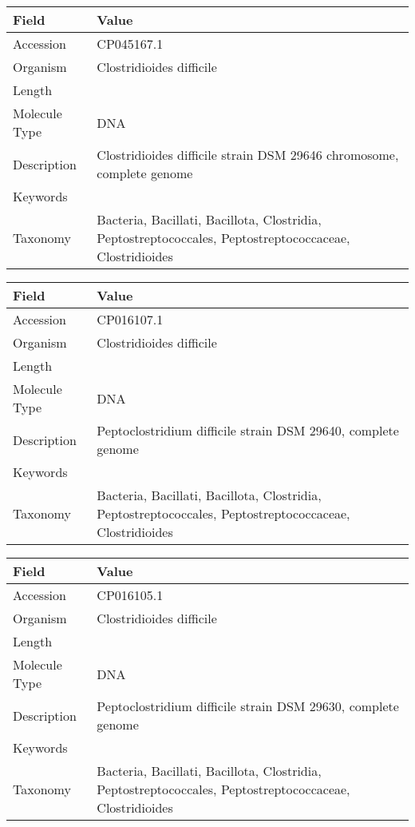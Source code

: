 \documentclass[10pt]{article}
\begin{document}
{\footnotesize
\begin{longtable}{>{\raggedright\arraybackslash}p{4.5cm} >{\raggedright\arraybackslash}p{11.5cm}}
\textbf{Field} & \textbf{Value} \\
\hline
Accession & CP045167.1 \\
Organism & Clostridioides difficile \\
Length & 4261912 \\
Molecule Type & DNA \\
Description & Clostridioides difficile strain DSM 29646 chromosome, complete genome \\
Keywords &  \\
Taxonomy & Bacteria, Bacillati, Bacillota, Clostridia, Peptostreptococcales, Peptostreptococcaceae, Clostridioides \\
\end{longtable}
}

{\footnotesize
\begin{longtable}{>{\raggedright\arraybackslash}p{4.5cm} >{\raggedright\arraybackslash}p{11.5cm}}
\textbf{Field} & \textbf{Value} \\
\hline
Accession & CP016107.1 \\
Organism & Clostridioides difficile \\
Length & 4182534 \\
Molecule Type & DNA \\
Description & Peptoclostridium difficile strain DSM 29640, complete genome \\
Keywords &  \\
Taxonomy & Bacteria, Bacillati, Bacillota, Clostridia, Peptostreptococcales, Peptostreptococcaceae, Clostridioides \\
\end{longtable}
}

{\footnotesize
\begin{longtable}{>{\raggedright\arraybackslash}p{4.5cm} >{\raggedright\arraybackslash}p{11.5cm}}
\textbf{Field} & \textbf{Value} \\
\hline
Accession & CP016105.1 \\
Organism & Clostridioides difficile \\
Length & 4351629 \\
Molecule Type & DNA \\
Description & Peptoclostridium difficile strain DSM 29630, complete genome \\
Keywords &  \\
Taxonomy & Bacteria, Bacillati, Bacillota, Clostridia, Peptostreptococcales, Peptostreptococcaceae, Clostridioides \\
\end{longtable}
}
\end{document}
